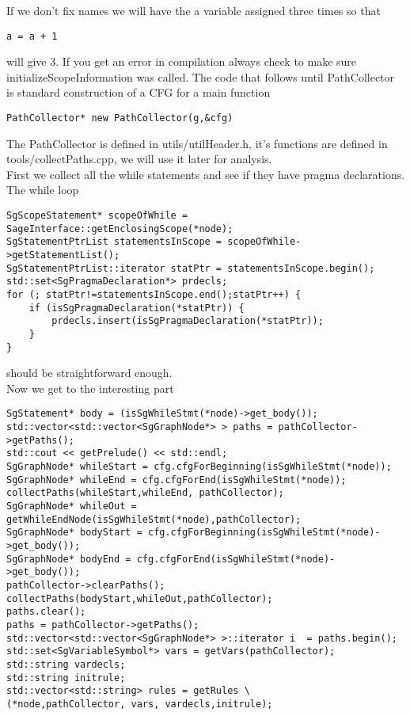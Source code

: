\documentclass[11pt]{article}
\begin{document}
If we don't fix names we will have the a variable assigned three times so that
\begin{lstlisting}
a = a + 1 
\end{lstlisting}
will give 3. If you get an error in compilation always check to make sure initializeScopeInformation was called. The code that follows until PathCollector is standard construction of a CFG for a main function\\
\begin{lstlisting}
PathCollector* new PathCollector(g,&cfg)
\end{lstlisting}
The PathCollector is defined in utils/utilHeader.h, it's functions are defined in tools/collectPaths.cpp, we will use it later for analysis.\\
First we collect all the while statements and see if they have pragma declarations.
The while loop
\begin{lstlisting}
SgScopeStatement* scopeOfWhile = SageInterface::getEnclosingScope(*node);
SgStatementPtrList statementsInScope = scopeOfWhile->getStatementList();
SgStatementPtrList::iterator statPtr = statementsInScope.begin();
std::set<SgPragmaDeclaration*> prdecls;
for (; statPtr!=statementsInScope.end();statPtr++) {
    if (isSgPragmaDeclaration(*statPtr)) {
        prdecls.insert(isSgPragmaDeclaration(*statPtr));
    }
}
\end{lstlisting}
should be straightforward enough.\\ 
Now we get to the interesting part
\begin{lstlisting}
SgStatement* body = (isSgWhileStmt(*node)->get_body());
std::vector<std::vector<SgGraphNode*> > paths = pathCollector->getPaths();
std::cout << getPrelude() << std::endl;
SgGraphNode* whileStart = cfg.cfgForBeginning(isSgWhileStmt(*node));
SgGraphNode* whileEnd = cfg.cfgForEnd(isSgWhileStmt(*node));
collectPaths(whileStart,whileEnd, pathCollector);
SgGraphNode* whileOut = getWhileEndNode(isSgWhileStmt(*node),pathCollector);
SgGraphNode* bodyStart = cfg.cfgForBeginning(isSgWhileStmt(*node)->get_body());
SgGraphNode* bodyEnd = cfg.cfgForEnd(isSgWhileStmt(*node)->get_body());
pathCollector->clearPaths();
collectPaths(bodyStart,whileOut,pathCollector);
paths.clear();
paths = pathCollector->getPaths();
std::vector<std::vector<SgGraphNode*> >::iterator i  = paths.begin();
std::set<SgVariableSymbol*> vars = getVars(pathCollector);
std::string vardecls;
std::string initrule;
std::vector<std::string> rules = getRules \
(*node,pathCollector, vars, vardecls,initrule);
\end{lstlisting}
\end{document}
